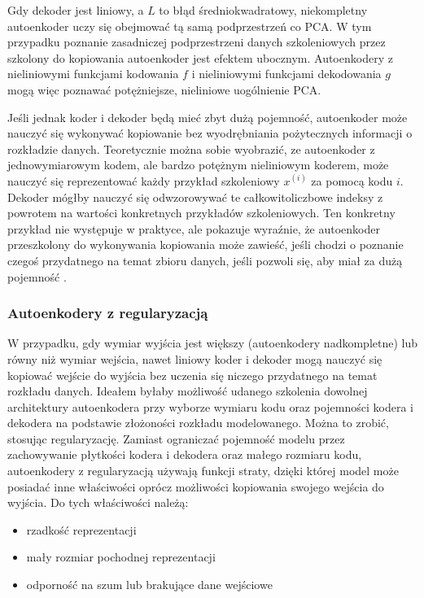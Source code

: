 \documentclass[12pt]{mwbk}
\theoremstyle{plain}
\theoremstyle{definition}
\theoremstyle{remark}
\begin{document}
Gdy dekoder jest liniowy, a $L$ to błąd średniokwadratowy, niekompletny autoenkoder uczy się obejmować tą samą podprzestrzeń co PCA. W tym przypadku poznanie zasadniczej podprzestrzeni danych szkoleniowych przez szkolony do kopiowania autoenkoder jest efektem ubocznym. Autoenkodery z nieliniowymi funkcjami kodowania $f$ i nieliniowymi funkcjami dekodowania $g$ mogą więc poznawać potężniejsze, nieliniowe uogólnienie PCA. 

Jeśli jednak koder i dekoder będą mieć zbyt dużą pojemność, autoenkoder może nauczyć się wykonywać kopiowanie bez wyodrębniania pożytecznych informacji o rozkładzie danych. Teoretycznie można sobie wyobrazić, ze autoenkoder z jednowymiarowym kodem, ale bardzo potężnym nieliniowym koderem, może nauczyć się reprezentować każdy przykład szkoleniowy $x^{(i)}$ za pomocą kodu $i$. Dekoder mógłby nauczyć się odwzorowywać te całkowitoliczbowe indeksy z powrotem na wartości konkretnych przykładów szkoleniowych. Ten konkretny przykład nie występuje w praktyce, ale pokazuje wyraźnie, że autoenkoder przeszkolony do wykonywania kopiowania może zawieść, jeśli chodzi o poznanie czegoś przydatnego na temat zbioru danych, jeśli pozwoli się, aby miał za dużą pojemność \cite{goodfellow}.

\subsubsection{Autoenkodery z regularyzacją}



W przypadku, gdy wymiar wyjścia jest większy (autoenkodery nadkompletne) lub równy niż wymiar wejścia, nawet liniowy koder i dekoder mogą nauczyć się kopiować wejście do wyjścia bez uczenia się niczego przydatnego na temat rozkładu danych.
Ideałem byłaby możliwość udanego szkolenia dowolnej architektury autoenkodera przy wyborze wymiaru kodu oraz pojemności kodera i dekodera na podstawie złożoności rozkładu modelowanego. Można to zrobić, stosując regularyzację. Zamiast ograniczać pojemność modelu przez zachowywanie płytkości kodera i dekodera oraz małego rozmiaru kodu, autoenkodery z regularyzacją używają funkcji straty, dzięki której model może posiadać inne właściwości oprócz możliwości kopiowania swojego wejścia do wyjścia. Do tych właściwości należą:

\begin{itemize}
	\item  rzadkość reprezentacji
	\item mały rozmiar pochodnej reprezentacji
	\item odporność na szum lub brakujące dane wejściowe
\end{itemize}
\end{document}

